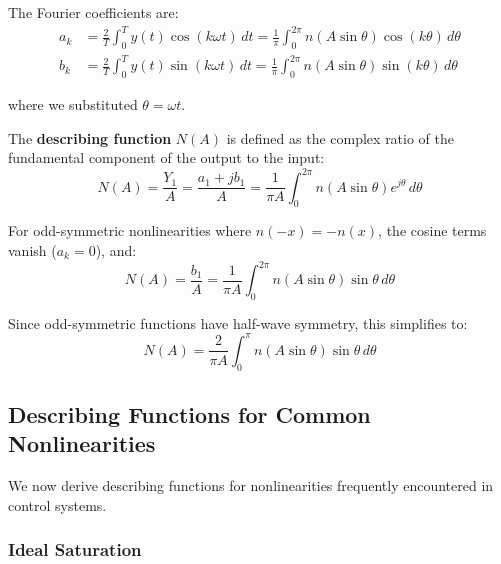 The Fourier coefficients are:
\begin{align}
a_k &= \frac{2}{T} \int_0^T y(t) \cos(k\omega t) \, dt = \frac{1}{\pi} \int_0^{2\pi} n(A\sin\theta) \cos(k\theta) \, d\theta \\
b_k &= \frac{2}{T} \int_0^T y(t) \sin(k\omega t) \, dt = \frac{1}{\pi} \int_0^{2\pi} n(A\sin\theta) \sin(k\theta) \, d\theta
\end{align}

where we substituted $\theta = \omega t$.

The \textbf{describing function} $N(A)$ is defined as the complex ratio of the fundamental component of the output to the input:
\begin{equation}
\boxed{N(A) = \frac{Y_1}{A} = \frac{a_1 + jb_1}{A} = \frac{1}{\pi A} \int_0^{2\pi} n(A\sin\theta) e^{j\theta} \, d\theta}
\label{eq:describing_function_def}
\end{equation}

For odd-symmetric nonlinearities where $n(-x) = -n(x)$, the cosine terms vanish ($a_k = 0$), and:
\begin{equation}
N(A) = \frac{b_1}{A} = \frac{1}{\pi A} \int_0^{2\pi} n(A\sin\theta) \sin\theta \, d\theta
\label{eq:df_odd_symmetric}
\end{equation}

Since odd-symmetric functions have half-wave symmetry, this simplifies to:
\begin{equation}
N(A) = \frac{2}{\pi A} \int_0^{\pi} n(A\sin\theta) \sin\theta \, d\theta
\label{eq:df_odd_symmetric_half}
\end{equation}


\subsection{Describing Functions for Common Nonlinearities}

We now derive describing functions for nonlinearities frequently encountered in control systems.

\subsubsection{Ideal Saturation}

